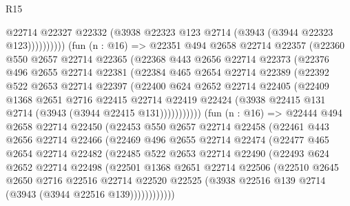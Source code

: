 \begin{lexlean}{R15}
\begin{coremodule}
                      @22714
                      @22327
                      @22332
                      (@3938 @22323 @123 @2714 (@3943 (@3944 @22323 @123))))))))))
        (fun (n : @16) =>
        @22351
          @494
          @2658
          @22714
          @22357
          (@22360
            @550
            @2657
            @22714
            @22365
            (@22368
              @443
              @2656
              @22714
              @22373
              (@22376
                @496
                @2655
                @22714
                @22381
                (@22384
                  @465
                  @2654
                  @22714
                  @22389
                  (@22392
                    @522
                    @2653
                    @22714
                    @22397
                    (@22400
                      @624
                      @2652
                      @22714
                      @22405
                      (@22409
                        @1368
                        @2651
                        @2716
                        @22415
                        @22714
                        @22419
                        @22424
                        (@3938 @22415 @131 @2714 (@3943 (@3944 @22415 @131)))))))))))
        (fun (n : @16) =>
        @22444
          @494
          @2658
          @22714
          @22450
          (@22453
            @550
            @2657
            @22714
            @22458
            (@22461
              @443
              @2656
              @22714
              @22466
              (@22469
                @496
                @2655
                @22714
                @22474
                (@22477
                  @465
                  @2654
                  @22714
                  @22482
                  (@22485
                    @522
                    @2653
                    @22714
                    @22490
                    (@22493
                      @624
                      @2652
                      @22714
                      @22498
                      (@22501
                        @1368
                        @2651
                        @22714
                        @22506
                        (@22510
                          @2645
                          @2650
                          @2716
                          @22516
                          @22714
                          @22520
                          @22525
                          (@3938 @22516 @139 @2714 (@3943 (@3944 @22516 @139))))))))))))

\end{coremodule}
\end{lexlean}
